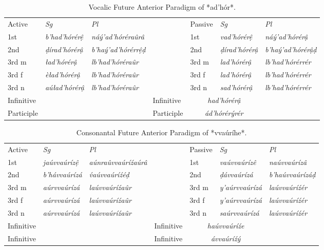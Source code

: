\documentclass[a4paper, 12pt, oneside, final]{article}
\let \nf \normalfont
\def \d {ḍ}
\begin{document}
\begin{table}[H]
\centering
\noindent\begin{tabular}{@{}|>{}l|>{\it}l|>{\it}l|>{}l|>{}l|>{\it}l|>{\it}l|}\cline{1-3}\cline{5-7}
Active&\nf Sg&\nf Pl& & Passive&\nf Sg&\nf Pl\\\cline{1-3}\cline{5-7}
1st   &b’had’hórérệ  &náý’ad’hóréraûrâ     &&1st    &vad’hórérệ    &náý’ad’hórérậ   \\\cline{1-3}\cline{5-7}
2nd   &ḍírad’hórérậ  &b’haý’ad’hórérrệḍ    &&2nd    &ḍírad’hórérậ  &b’haý’ad’hórérậḍ \\\cline{1-3}\cline{5-7}
3rd m &ład’hórérậ    &lb’had’hóréraûr      &&3rd m  &lad’hórérậ    &lb’had’hórérrér  \\\cline{1-3}\cline{5-7}
3rd f &èład’hórérậ   &lb’had’hóréraûr      &&3rd f  &lad’hórérậ    &lb’had’hórérrér  \\\cline{1-3}\cline{5-7}
3rd n &aúład’hórérậ  &lb’had’hóréraûr      &&3rd n  &sad’hórérậ    &lb’had’hórérrér  \\\cline{1-3}\cline{5-7}
Infinitive&\multicolumn{2}{c|}{\it dad’hórérâ}&&Infinitive&\multicolumn{2}{c|}{\it had’hórérậ}\\\cline{1-3}\cline{5-7}
Participle&\multicolumn{2}{c|}{\it ad’hórérŷrér}&&Participle&\multicolumn{2}{c|}{\it ád’hórérýrér}\\\cline{1-3}\cline{5-7}
\end{tabular}
\caption{Vocalic Future Anterior Paradigm of *ad’hór*.}\label{tab:future-ant-adhor}
\end{table}

\begin{table}[H]
\centering
\noindent\begin{tabular}{@{}|>{}l|>{\it}l|>{\it}l|>{}l|>{}l|>{\it}l|>{\it}l|}\cline{1-3}\cline{5-7}
Active&\nf Sg&\nf Pl& & Passive&\nf Sg&\nf Pl\\\cline{1-3}\cline{5-7}
1st   &jaúvvaúrízệ  &aúnraûvvaúríźaúrâ &&1st   &vaúvvaúrízê    &naúvvaúrízâ       \\\cline{1-3}\cline{5-7}
2nd   &b’hávvaúrízá &v́aúvvaúríźéḍ     &&2nd   &\d{}ávvaúrízá  &b’haúvvaúrízáḍ     \\\cline{1-3}\cline{5-7}
3rd m &aúrvvaúrízá  &laúvvaúríźaûr    &&3rd m &y’aúrvvaúrízá  &laúvvaúríźér \\\cline{1-3}\cline{5-7}
3rd f &aúrvvaúrízá  &laúvvaúríźaûr    &&3rd f &y’aúrvvaúrízá  &laúvvaúríźér \\\cline{1-3}\cline{5-7}
3rd n &aúrvvaúrízá  &laúvvaúríźaûr    &&3rd n &saúrvvaúrízá   &laúvvaúríźér \\\cline{1-3}\cline{5-7}
Infinitive&\multicolumn{2}{c|}{\it dẹvvaúríźá}&&Infinitive&\multicolumn{2}{c|}{\it haúvvaúríźe}\\\cline{1-3}\cline{5-7}
Infinitive&\multicolumn{2}{c|}{\it vvaúríźŷr}&&Infinitive&\multicolumn{2}{c|}{\it ávvaúríźý}\\\cline{1-3}\cline{5-7}
\end{tabular}
\caption{Consonantal Future Anterior Paradigm of *vvaúríhe*.}\label{tab:future-ant-vvaurihe}
\end{table}
\end{document}
